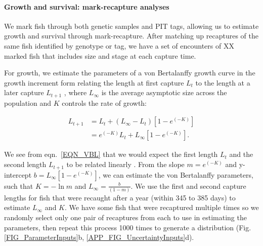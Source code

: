 \documentclass[12pt, oneside]{article}   	%
\begin{document}
\paragraph*{Growth and survival: mark-recapture analyses}

We mark fish through both genetic samples and PIT tags, allowing us to estimate growth and survival through mark-recapture. After matching up recaptures of the same fish identified by genotype or tag, we have a set of encounters of XX marked fish that includes size and stage at each capture time.

For growth, we estimate the parameters of a von Bertalanffy growth curve \citep{fabens1965properties} in the growth increment form relating the length at first capture $L_t$ to the length at a later capture $L_{t+1}$ \citep{hart2009estimating}, where $L_\infty$ is the average asymptotic size across the population and $K$ controls the rate of growth: %

\begin{equation} \label{EQN_VBL} 
\begin{split}
L_{t+1} & = L_t + (L_\infty - L_t)[1 - e^{(-K)}] \\
 & = e^{(-K)}L_t + L_\infty[1 - e^{(-K)}].
\end{split}
\end{equation}

We see from eqn.\ \ref{EQN_VBL} that we would expect the first length $L_t$ and the second length $L_{t+1}$ to be related linearly \citep{hart2009estimating}. From the slope $m = e^{(-K)}$ and y-intercept $b =  L_\infty[1 - e^{(-K)}]$, we can estimate the von Bertalanffy parameters, such that $K = -\ln m$ and $L_\infty = \frac{b}{(1-m)}$. We use the first and second capture lengths for fish that were recaught after a year (within 345 to 385 days) to estimate $L_\infty$ and $K$. We have some fish that were recaptured multiple times so we randomly select only one pair of recaptures from each to use in estimating the parameters, then repeat this process 1000 times to generate a distribution (Fig. \ref{FIG_ParameterInputs}b, \ref{APP_FIG_UncertaintyInputs}d). 
\end{document}
